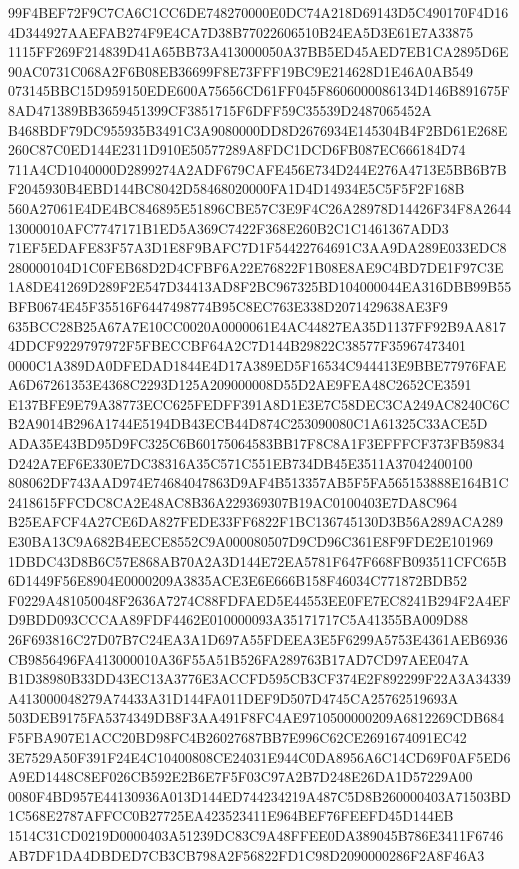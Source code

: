 \documentclass[UTF8,fontset=fandol,zihao=-4,a4paper]{ctexart}
\begin{document}
{{99F4BEF72F9C7CA6C1CC6DE748270000E0DC74A218D69143D5C490170F4D164D344927AAEFAB274F9E4CA7D38B77022606510B24EA5D3E61E7A33875
1115FF269F214839D41A65BB73A413000050A37BB5ED45AED7EB1CA2895D6E90AC0731C068A2F6B08EB36699F8E73FFF19BC9E214628D1E46A0AB549
073145BBC15D959150EDE600A75656CD61FF045F8606000086134D146B891675F8AD471389BB3659451399CF3851715F6DFF59C35539D2487065452A
B468BDF79DC955935B3491C3A9080000DD8D2676934E145304B4F2BD61E268E260C87C0ED144E2311D910E50577289A8FDC1DCD6FB087EC666184D74
711A4CD1040000D2899274A2ADF679CAFE456E734D244E276A4713E5BB6B7BF2045930B4EBD144BC8042D58468020000FA1D4D14934E5C5F5F2F168B
560A27061E4DE4BC846895E51896CBE57C3E9F4C26A28978D14426F34F8A264413000010AFC7747171B1ED5A369C7422F368E260B2C1C1461367ADD3
71EF5EDAFE83F57A3D1E8F9BAFC7D1F54422764691C3AA9DA289E033EDC8280000104D1C0FEB68D2D4CFBF6A22E76822F1B08E8AE9C4BD7DE1F97C3E
1A8DE41269D289F2E547D34413AD8F2BC967325BD104000044EA316DBB99B55BFB0674E45F35516F6447498774B95C8EC763E338D2071429638AE3F9
635BCC28B25A67A7E10CC0020A0000061E4AC44827EA35D1137FF92B9AA8174DDCF9229797972F5FBECCBF64A2C7D144B29822C38577F35967473401
0000C1A389DA0DFEDAD1844E4D17A389ED5F16534C944413E9BBE77976FAEA6D67261353E4368C2293D125A209000008D55D2AE9FEA48C2652CE3591
E137BFE9E79A38773ECC625FEDFF391A8D1E3E7C58DEC3CA249AC8240C6CB2A9014B296A1744E5194DB43ECB44D874C253090080C1A61325C33ACE5D
ADA35E43BD95D9FC325C6B60175064583BB17F8C8A1F3EFFFCF373FB59834D242A7EF6E330E7DC38316A35C571C551EB734DB45E3511A37042400100
808062DF743AAD974E74684047863D9AF4B513357AB5F5FA565153888E164B1C2418615FFCDC8CA2E48AC8B36A229369307B19AC0100403E7DA8C964
B25EAFCF4A27CE6DA827FEDE33FF6822F1BC136745130D3B56A289ACA289E30BA13C9A682B4EECE8552C9A000080507D9CD96C361E8F9FDE2E101969
1DBDC43D8B6C57E868AB70A2A3D144E72EA5781F647F668FB093511CFC65B6D1449F56E8904E0000209A3835ACE3E6E666B158F46034C771872BDB52
F0229A481050048F2636A7274C88FDFAED5E44553EE0FE7EC8241B294F2A4EFD9BDD093CCCAA89FDF4462E010000093A35171717C5A41355BA009D88
26F693816C27D07B7C24EA3A1D697A55FDEEA3E5F6299A5753E4361AEB6936CB9856496FA413000010A36F55A51B526FA289763B17AD7CD97AEE047A
B1D38980B33DD43EC13A3776E3ACCFD595CB3CF374E2F892299F22A3A34339A413000048279A74433A31D144FA011DEF9D507D4745CA25762519693A
503DEB9175FA5374349DB8F3AA491F8FC4AE9710500000209A6812269CDB684F5FBA907E1ACC20BD98FC4B26027687BB7E996C62CE2691674091EC42
3E7529A50F391F24E4C10400808CE24031E944C0DA8956A6C14CD69F0AF5ED6A9ED1448C8EF026CB592E2B6E7F5F03C97A2B7D248E26DA1D57229A00
0080F4BD957E44130936A013D144ED744234219A487C5D8B260000403A71503BD1C568E2787AFFCC0B27725EA423523411E964BEF76FEEFD45D144EB
1514C31CD0219D0000403A51239DC83C9A48FFEE0DA389045B786E3411F6746AB7DF1DA4DBDED7CB3CB798A2F56822FD1C98D2090000286F2A8F46A3
}}
\end{document}
